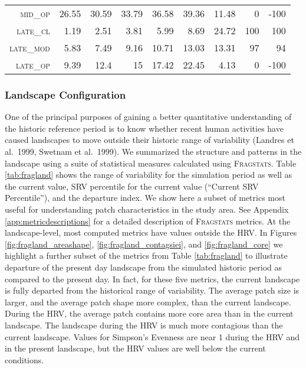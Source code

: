 \begin{table}[!htbp]
\begin{tabular}{@{}rrrrrr|rrr@{}}
 \textsc{mid\_op   }      &  26.55         &  30.59    &  33.79    &  36.58    &  39.36     &  11.48       &   0      &  -100    \\
 \textsc{late\_cl  }      &  1.19          &  2.51     &  3.81     &  5.99     &  8.69      &  24.72       &   100    &  100      \\
 \textsc{late\_mod }      &  5.83          &  7.49     &  9.16     &  10.71    &  13.03     &  13.31       &   97     &  94     \\
 \textsc{late\_op  }      &  9.39          &  12.4     &  15       &  17.42    &  22.45     &  4.13        &   0     &   -100  \\ \bottomrule 
\end{tabular}
\end{table}

\clearpage


\subsubsection{Landscape Configuration}
One of the principal purposes of gaining a better quantitative understanding of the historic reference period is to know whether recent human activities have caused landscapes to move outside their historic range of variability (Landres et al.\ 1999, Swetnam et al.\ 1999). We summarized the structure and patterns in the landscape using a suite of statistical measures calculated using \textsc{Fragstats}. Table \ref{tab:fragland} shows the range of variability for the simulation period as well as the current value, SRV percentile for the current value (``Current SRV Percentile''), and the departure index. We show here a subset of metrics most useful for understanding patch characteristics in the study area. See Appendix \ref{app:metricdescriptions} for a detailed description of \textsc{Fragstats} metrics. At the landscape-level, most computed metrics have values outside the HRV. In Figures \ref{fig:fragland_areashape}, \ref{fig:fragland_contagsiei}, and \ref{fig:fragland_core} we highlight a further subset of the metrics from Table \ref{tab:fragland} to illustrate departure of the present day landscape from the simulated historic period as compared to the present day. In fact, for these five metrics, the current landscape is fully departed from the historical range of variability. The average patch size is larger, and the average patch shape more complex, than the current landscape. During the HRV, the average patch contains more core area than in the current landscape. The landscape during the HRV is much more contagious than the current landscape. Values for Simpson's Evenness are near 1 during the HRV and in the present landscape, but the HRV values are well below the current conditions.

